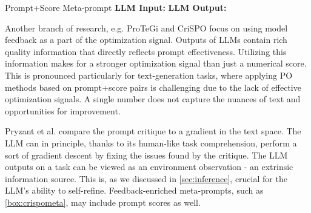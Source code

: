 \begin{promptbox}
    [label={box:oprometa}]{Prompt+Score Meta-prompt}
    \textbf{LLM Input:} 
    \textbf{LLM Output:}
\end{promptbox}

\newpage

Another branch of research, e.g. ProTeGi\cite{pryzant2023automaticpromptoptimizationgradient} and CriSPO\cite{he2024crispomultiaspectcritiquesuggestionguidedautomatic}
focus on using model feedback as a part of the optimization signal. Outputs of LLMs contain rich quality 
information that directly reflects prompt effectiveness\cite{xiang2025selfsupervisedpromptoptimization}. 
Utilizing this information makes for a stronger optimization signal than just a numerical score.
This is pronounced particularly for text-generation tasks, where applying PO methods based on prompt+score pairs 
is challenging due to the lack of effective optimization signals\cite{he2024crispomultiaspectcritiquesuggestionguidedautomatic}.
A single number does not capture the nuances of text and opportunities for improvement. 

Pryzant et al.\cite{pryzant2023automaticpromptoptimizationgradient}
compare the prompt critique to a gradient in the text space. The LLM can in principle, thanks to its human-like task comprehension\cite{xiang2025selfsupervisedpromptoptimization},
perform a sort of gradient descent by fixing the issues found by the critique. The LLM outputs on a task can be viewed as an environment observation - an extrinsic information source.
This is, as we discussed in \ref{sec:inference}, crucial for the LLM's ability to self-refine. 
Feedback-enriched meta-prompts, such as \ref{box:crispometa}, may include prompt scores as well.

